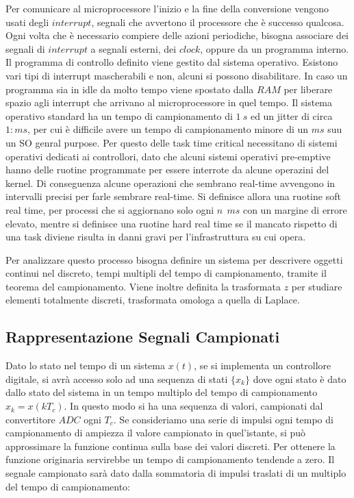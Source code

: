\documentclass{article}
\numberwithin{equation}{subsection}
\begin{document}
Per comunicare al microprocessore l'inizio e la fine della conversione vengono usati degli $interrupt$, segnali che avvertono il processore che è successo qualcosa. Ogni 
volta che è necessario compiere delle azioni periodiche, bisogna associare dei segnali di $interrupt$ a segnali esterni, dei $clock$, oppure da un programma interno. Il 
programma di controllo definito viene gestito dal sistema operativo. Esistono vari tipi di interrupt mascherabili e non, alcuni si possono disabilitare. In caso un programma 
sia in idle da molto tempo viene spostato dalla $RAM$ per liberare spazio agli interrupt che arrivano al microprocessore in quel tempo. Il sistema operativo standard ha un 
tempo di campionamento di $1\:s$ ed un jitter di circa $1:ms$, per cui è difficile avere un tempo di campionamento minore di un $ms$ suu un SO genral purpose. Per questo 
delle task time critical necessitano di sistemi operativi dedicati ai controllori, dato che alcuni sistemi operativi pre-emptive hanno delle ruotine programmate per essere 
interrote da alcune operazini del kernel. Di conseguenza alcune operazioni che sembrano real-time avvengono in intervalli precisi per farle sembrare real-time. 
Si definisce allora una ruotine soft real time, per processi che si aggiornano solo ogni $n\:\:ms$ con un margine di errore elevato, mentre si definisce una ruotine hard real 
time se il mancato rispetto di una task diviene risulta in danni gravi per l'infrastruttura su cui opera. 

Per analizzare questo processo bisogna definire un sistema per descrivere oggetti continui nel discreto, tempi multipli del tempo di campionamento, tramite il teorema del 
campionamento. Viene inoltre definita la trasformata $z$ per studiare elementi totalmente discreti, trasformata omologa a quella di Laplace. 

\subsection{Rappresentazione Segnali Campionati}

Dato lo stato nel tempo di un sistema $x(t)$, se si implementa un controllore digitale, si avrà accesso solo ad una sequenza di stati $\{x_k\}$ dove ogni stato è dato dallo 
stato del sistema in un tempo multiplo del tempo di campionamento $x_k=x(kT_c)$. In questo modo si ha una sequenza di valori, campionati dal convertitore $ADC$ ogni $T_c$. Se 
consideriamo una serie di impulsi ogni tempo di campionamento di ampiezza il valore campionato in quel'istante, si può approssimare la funzione continua sulla base dei 
valori discreti. Per ottenere la funzione originaria servirebbe un tempo di campionamento tendende a zero. Il segnale campionato sarà dato 
dalla sommatoria di impulsi traslati di un multiplo del tempo di campionamento:
\end{document}
